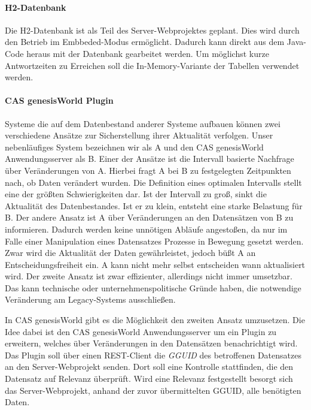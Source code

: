 
\paragraph{H2-Datenbank}

Die H2-Datenbank ist als Teil des Server-Webprojektes geplant. Dies wird durch den Betrieb im Embbeded-Modus ermöglicht. Dadurch kann direkt aus dem Java-Code heraus mit der Datenbank gearbeitet werden. Um möglichst kurze Antwortzeiten zu Erreichen soll die In-Memory-Variante der Tabellen verwendet werden.

\paragraph{CAS genesisWorld Plugin} Systeme die auf dem Datenbestand anderer Systeme aufbauen können zwei verschiedene  Ansätze zur Sicherstellung ihrer Aktualität verfolgen. Unser nebenläufiges System bezeichnen wir als A und den CAS genesisWorld Anwendungsserver als B. Einer der Ansätze ist die Intervall basierte Nachfrage über Veränderungen von A. Hierbei fragt A bei B zu festgelegten Zeitpunkten nach, ob Daten verändert wurden. Die Definition eines optimalen Intervalls stellt eine der größten Schwierigkeiten dar. Ist der Intervall zu groß, sinkt die Aktualität des Datenbestandes. Ist er zu klein, entsteht eine starke Belastung für B. Der andere Ansatz ist A über Veränderungen an den Datensätzen von B zu informieren. Dadurch werden keine unnötigen Abläufe angestoßen, da nur im Falle einer Manipulation eines Datensatzes Prozesse in Bewegung gesetzt werden. Zwar wird die Aktualität der Daten gewährleistet, jedoch büßt A an Entscheidungsfreiheit ein. A kann nicht mehr selbst entscheiden wann aktualisiert wird. Der zweite Ansatz ist zwar effizienter, allerdings nicht immer umsetzbar. Das kann technische oder unternehmenspolitische Gründe haben, die notwendige Veränderung am Legacy-Systems ausschließen.  

In CAS genesisWorld gibt es die Möglichkeit den zweiten Ansatz umzusetzen. Die Idee dabei ist den CAS genesisWorld Anwendungsserver um ein Plugin zu erweitern, welches über Veränderungen in den Datensätzen benachrichtigt wird. Das Plugin soll über einen REST-Client die \textit{GGUID} des betroffenen Datensatzes an den Server-Webprojekt senden. Dort soll eine Kontrolle stattfinden, die den Datensatz auf Relevanz überprüft. Wird eine Relevanz festgestellt besorgt sich das Server-Webprojekt, anhand der zuvor übermittelten GGUID, alle benötigten Daten.


